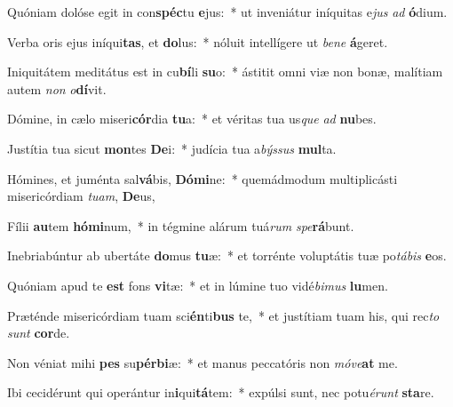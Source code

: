 \item Quóniam dolóse egit in con\textbf{spéc}tu \textbf{e}jus:~* ut inveniátur iníquitas e\textit{jus} \textit{ad} \textbf{ó}dium.
\item Verba oris ejus iníqui\textbf{tas}, et \textbf{do}lus:~* nóluit intellígere ut \textit{be}\textit{ne} \textbf{á}geret.
\item Iniquitátem meditátus est in cu\textbf{bí}li \textbf{su}o:~* ástitit omni viæ non bonæ, malítiam autem \textit{non} \textit{o}\textbf{dí}vit.
\item Dómine, in cælo miseri\textbf{cór}dia \textbf{tu}a:~* et véritas tua us\textit{que} \textit{ad} \textbf{nu}bes.
\item Justítia tua sicut \textbf{mon}tes \textbf{De}i:~* judícia tua a\textit{býs}\textit{sus} \textbf{mul}ta.
\item Hómines, et juménta sal\textbf{vá}bis, \textbf{Dó}\textbf{mi}ne:~* quemádmodum multiplicásti misericórdiam \textit{tu}\textit{am}, \textbf{De}us,
\item Fílii \textbf{au}tem \textbf{hó}\textbf{mi}num,~* in tégmine alárum tuá\textit{rum} \textit{spe}\textbf{rá}bunt.
\item Inebriabúntur ab ubertáte \textbf{do}mus \textbf{tu}æ:~* et torrénte voluptátis tuæ po\textit{tá}\textit{bis} \textbf{e}os.
\item Quóniam apud te \textbf{est} fons \textbf{vi}tæ:~* et in lúmine tuo vidé\textit{bi}\textit{mus} \textbf{lu}men.
\item Præténde misericórdiam tuam sci\textbf{én}ti\textbf{bus} te,~* et justítiam tuam his, qui rec\textit{to} \textit{sunt} \textbf{cor}de.
\item Non véniat mihi \textbf{pes} su\textbf{pér}\textbf{bi}æ:~* et manus peccatóris non \textit{mó}\textit{ve}\textbf{at} me.
\item Ibi cecidérunt qui operántur in\textbf{i}qui\textbf{tá}tem:~* expúlsi sunt, nec potu\textit{é}\textit{runt} \textbf{sta}re.
